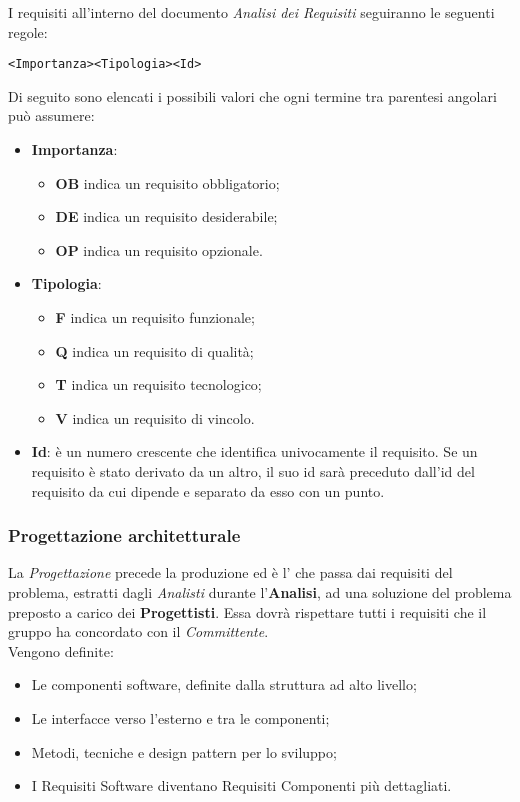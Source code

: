 \documentclass{scalatekids-article}
\begin{document}
\label{sec:adr}
I requisiti all'interno del documento \textit{Analisi dei Requisiti} seguiranno le seguenti regole:
\begin{center}
    \verb=<Importanza><Tipologia><Id>=
\end{center}
Di seguito sono elencati i possibili valori che ogni termine tra parentesi angolari può assumere:
\begin{itemize}
    \item \textbf{Importanza}:
        \begin{itemize}
            \item \textbf{OB} indica un requisito obbligatorio;
            \item \textbf{DE} indica un requisito desiderabile;
            \item \textbf{OP} indica un requisito opzionale.
        \end{itemize}
    \item \textbf{Tipologia}:
        \begin{itemize}
            \item \textbf{F} indica un requisito funzionale;
            \item \textbf{Q} indica un requisito di qualità;
            \item \textbf{T} indica un requisito tecnologico;
            \item \textbf{V} indica un requisito di vincolo.
        \end{itemize}
    \item \textbf{Id}: è un numero crescente che identifica univocamente il requisito. Se un requisito è stato derivato da un altro, il suo id sarà preceduto dall'id del requisito da cui dipende e separato da esso con un punto.
\end{itemize}

\subsubsection{Progettazione architetturale}

La \textit{Progettazione} precede la produzione ed è l' che
passa dai requisiti del problema, estratti dagli \textit{Analisti} durante
l'\textbf{Analisi}, ad una soluzione del problema preposto a carico dei
\textbf{Progettisti}. Essa dovrà rispettare tutti i requisiti che il gruppo ha
concordato con il \textit{Committente}.\\
Vengono definite:
\begin{itemize}
    \item Le componenti software, definite dalla struttura ad alto livello;
    \item Le interfacce verso l'esterno e tra le componenti;
    \item Metodi, tecniche e design pattern per lo sviluppo;
    \item I Requisiti Software diventano Requisiti Componenti più
        dettagliati.
\end{itemize}
\end{document}
